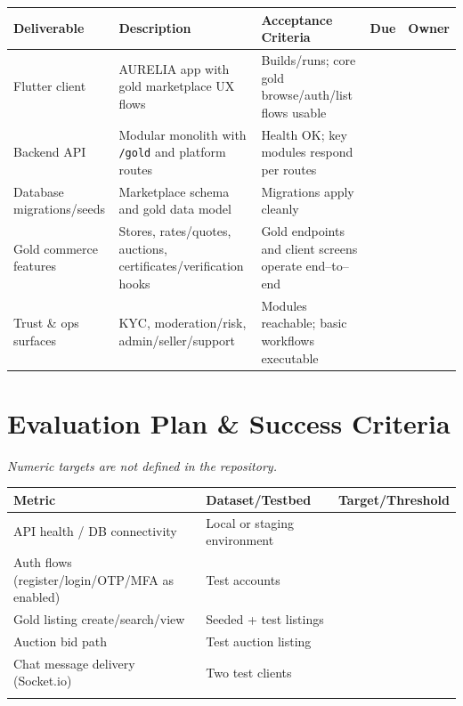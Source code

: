 \documentclass[11pt,a4paper]{article}
\begin{document}
\begin{tabularx}{\textwidth}{@{}*{5}{>{\raggedright\arraybackslash}X}@{}}
\toprule
\textbf{Deliverable} & \textbf{Description} & \textbf{Acceptance Criteria} & \textbf{Due} & \textbf{Owner} \\
\midrule
Flutter client & AURELIA app with gold marketplace UX flows & Builds/runs; core gold browse/auth/list flows usable &  &  \\
\addlinespace
Backend API & Modular monolith with \texttt{/gold} and platform routes & Health OK; key modules respond per routes &  &  \\
\addlinespace
Database migrations/seeds & Marketplace schema and gold data model & Migrations apply cleanly &  &  \\
\addlinespace
Gold commerce features & Stores, rates/quotes, auctions, certificates/verification hooks & Gold endpoints and client screens operate end--to--end &  &  \\
\addlinespace
Trust \& ops surfaces & KYC, moderation/risk, admin/seller/support & Modules reachable; basic workflows executable &  &  \\
\bottomrule
\end{tabularx}

\section{Evaluation Plan \& Success Criteria}

\textit{Numeric targets are not defined in the repository.}

\begin{tabularx}{\textwidth}{@{}*{3}{>{\raggedright\arraybackslash}X}@{}}
\toprule
\textbf{Metric} & \textbf{Dataset/Testbed} & \textbf{Target/Threshold} \\
\midrule
API health / DB connectivity & Local or staging environment &  \\
Auth flows (register/login/OTP/MFA as enabled) & Test accounts &  \\
Gold listing create/search/view & Seeded + test listings &  \\
Auction bid path & Test auction listing &  \\
Chat message delivery (Socket.io) & Two test clients &  \\
 &  &  \\
\bottomrule
\end{tabularx}
\end{document}
